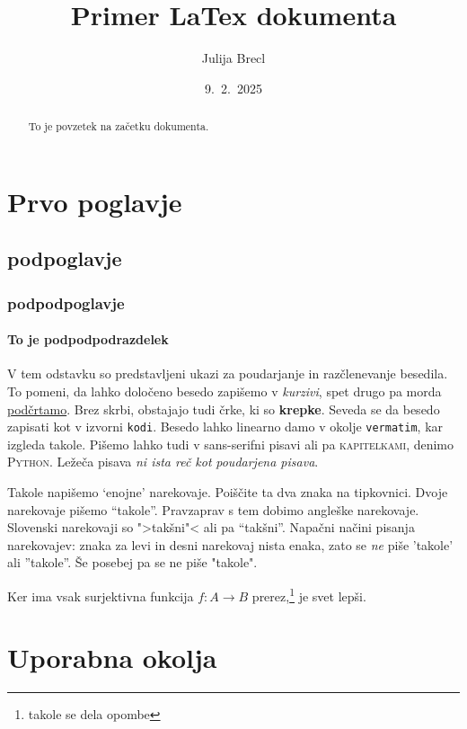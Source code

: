 \documentclass[a4paper, 10pt]{article}
\begin{document}
\title{Primer LaTex dokumenta}
\author{Julija Brecl}
\date{9.\ 2.\ 2025}
\maketitle

\begin{abstract}
    To je povzetek na začetku dokumenta.
\end{abstract}


\section{Prvo poglavje}
\subsection{podpoglavje}
\subsubsection{podpodpoglavje}
\paragraph{To je podpodpodrazdelek}

V tem odstavku so predstavljeni ukazi za poudarjanje in razčlenevanje besedila. To pomeni, da lahko določeno besedo zapišemo v \emph{kurzivi}, spet drugo pa morda \underline{podčrtamo}. Brez skrbi, obstajajo tudi črke, ki so \textbf{krepke}. Seveda se da besedo zapisati kot v izvorni \texttt{kodi}. Besedo lahko linearno damo v okolje \verb|vermatim|, kar izgleda takole. Pišemo lahko tudi v \textsf{sans-serifni pisavi} ali pa \textsc{kapitelkami},
denimo \textsc{Python}. Ležeča pisava \textsl{ni ista reč kot} \emph{poudarjena pisava}.

Takole napišemo `enojne' narekovaje. Poiščite ta dva znaka na tipkovnici. Dvoje narekovaje
pišemo ``takole''. Pravzaprav s tem dobimo angleške narekovaje. Slovenski narekovaji so
">takšni"< ali pa "`takšni"'.
Napačni načini pisanja narekovajev: znaka za levi in desni narekovaj nista enaka, zato se
\emph{ne} piše 'takole' ali ''takole''. Še posebej pa se ne piše "takole".

Ker ima vsak surjektivna funkcija $f : A \to B$ prerez,\footnote{takole se dela opombe} je svet lepši.



\section{Uporabna okolja}
\end{document}

